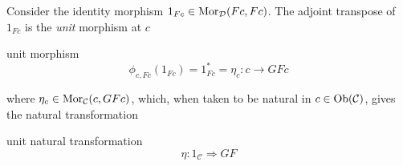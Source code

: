 \begin{frame}
Consider the identity morphism $1_{Fc} \in \mathop{\rm Mor}\nolimits_{\mathcal{D}}(Fc,Fc)$. The adjoint transpose of $1_{Fc}$ is the {\it unit} morphism at $c$
\begin{block}{unit morphism}
\abovedisplayskip=0pt
$$
\phi_{c,Fc}(1_{Fc})=1_{Fc}^*=\eta_c: c \rightarrow GFc
$$
\end{block}
where $\eta_c \in \mathop{\rm Mor}\nolimits_{\mathcal{C}}(c,GFc)$, which, when taken to be natural in $c \in \mathop{\rm Ob}\nolimits(\mathcal{C})$, gives the natural transformation
\begin{block}{unit natural transformation}
\abovedisplayskip=0pt
$$
\eta : 1_{\mathcal{C}} \Rightarrow GF
$$
\end{block}
\end{frame}